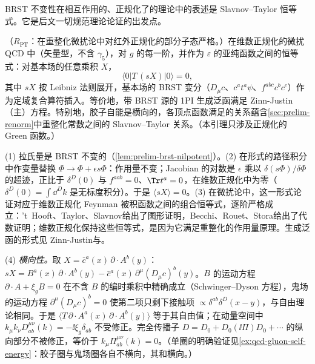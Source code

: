 BRST 不变性在相互作用的、正规化了的理论中的表述是 Slavnov--Taylor 恒等式。它是后文一切规范理论论证的出发点。

\begin{lemma}\label{lem:qcd-st-regularized}
（$R_{\mathrm{PT}}$：在重整化微扰论中对红外正规化的部分子态严格。）在维数正规化的微扰 QCD 中（矢量型，不含 $\gamma_5$），对 $g$ 的每一阶，并作为 $\varepsilon$ 的亚纯函数之间的恒等式：对基本场的任意乘积 $X$，
\begin{equation}\label{eq:qcd-st-regularized}
\langle0|T\,(sX)|0\rangle=0 ,
\end{equation}
其中 $sX$ 按 Leibniz 法则展开，基本场的 BRST 变分（$D_\mu c$、$c^at^a\psi$、$f^{abc}c^bc^c$）作为定域复合算符插入。等价地，带 BRST 源的 1PI 生成泛函满足 Zinn-Justin（主）方程。特别地，胶子自能是横向的，各顶点函数满足的关系蕴含\cref{sec:prelim-renorm}中重整化常数之间的 Slavnov--Taylor 关系。（本引理只涉及正规化的 Green 函数。）
\end{lemma}

\begin{proofsketch}
(1) 拉氏量是 BRST 不变的（\cref{lem:prelim-brst-nilpotent}）。(2) 在形式的路径积分中作变量替换 $\Phi\to\Phi+\epsilon s\Phi$：作用量不变；Jacobian 的对数是 $\epsilon$ 乘以 $\delta(s\Phi)/\delta\Phi$ 的超迹，正比于 $\delta^D(0)$ 与 $f^{aab}=0$、$\Tr t^a=0$，在维数正规化中为零（$\delta^D(0)=\int\dd^Dk$ 是无标度积分）。于是 $\langle sX\rangle=0$。(3) 在微扰论中，这一形式论证对应于维数正规化 Feynman 被积函数之间的组合恒等式，逐阶严格成立：'t~Hooft\cite{tHooft1971}、Taylor\cite{Taylor1971}、Slavnov\cite{Slavnov1972}给出了图形证明，Becchi、Rouet、Stora\cite{BecchiRouetStora1976}给出了代数证明；维数正规化保持这些恒等式，是因为它满足重整化的作用量原理\cite{BreitenlohnerMaison1977a}。生成泛函的形式见 Zinn-Justin\cite{Zinn-Justin:1974ggz}与\cite{KugoOjima1979,Collins1984}。

(4) \emph{横向性。}取 $X=\bar c^a(x)\,\partial\cdot A^b(y)$：$sX=B^a(x)\,\partial\cdot A^b(y)-\bar c^a(x)\,\partial^\mu(D_\mu c)^b(y)$。$B$ 的运动方程 $\partial\cdot A+\xi_gB=0$ 在不含 $B$ 的编时乘积中精确成立（Schwinger--Dyson 方程），鬼场的运动方程 $\partial^\mu(D_\mu c)^b=0$ 使第二项只剩下接触项 $\propto\delta^{ab}\delta^D(x-y)$，与自由理论相同。于是 $\langle T\,\partial\cdot A^a(x)\,\partial\cdot A^b(y)\rangle$ 等于其自由值；在动量空间中 $k_\mu k_\nu D^{\mu\nu}_{ab}(k)=-\ii\xi_g\delta_{ab}$ 不受修正。完全传播子 $D=D_0+D_0(\ii\Pi)D_0+\cdots$ 的纵向部分不被修正，等价于 $k_\mu\Pi^{\mu\nu}_{ab}(k)=0$。（单圈的明确验证见\cref{ex:qcd-gluon-self-energy}：胶子圈与鬼场圈各自不横向，其和横向。）
\end{proofsketch}

